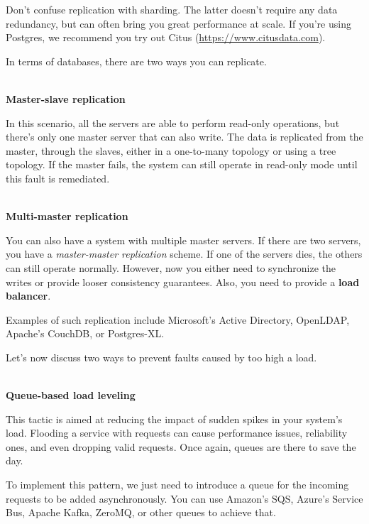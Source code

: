 \begin{tcolorbox}[colback=blue!5!white,colframe=blue!75!black, title=Note]
\hspace*{0.7cm}Don't confuse replication with sharding. The latter doesn't require any data redundancy, but can often bring you great performance at scale. If you're using Postgres, we recommend you try out Citus (\url{https://www.citusdata.com}).
\end{tcolorbox}

In terms of databases, there are two ways you can replicate. 

\hspace*{\fill} \\ %
\noindent
\textbf{Master-slave replication}

In this scenario, all the servers are able to perform read-only operations, but there's only one master server that can also write. The data is replicated from the master, through the slaves, either in a one-to-many topology or using a tree topology. If the master fails, the system can still operate in read-only mode until this fault is remediated.

\hspace*{\fill} \\ %
\noindent
\textbf{Multi-master replication}

You can also have a system with multiple master servers. If there are two servers, you have a \textit{master-master replication} scheme. If one of the servers dies, the others can still operate normally. However, now you either need to synchronize the writes or provide looser consistency guarantees. Also, you need to provide a \textbf{load balancer}.

Examples of such replication include Microsoft's Active Directory, OpenLDAP, Apache's CouchDB, or Postgres-XL.

Let's now discuss two ways to prevent faults caused by too high a load.


\hspace*{\fill} \\ %
\noindent
\textbf{Queue-based load leveling}

This tactic is aimed at reducing the impact of sudden spikes in your system's load. Flooding a service with requests can cause performance issues, reliability ones, and even dropping valid requests. Once again, queues are there to save the day.

To implement this pattern, we just need to introduce a queue for the incoming requests to be added asynchronously. You can use Amazon's SQS, Azure's Service Bus, Apache Kafka, ZeroMQ, or other queues to achieve that.

